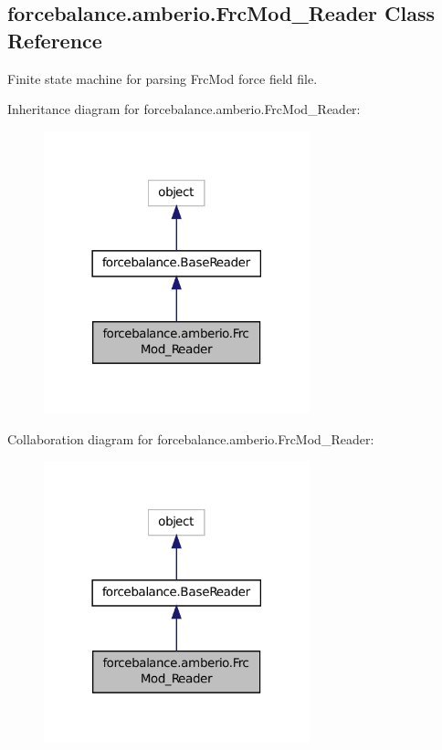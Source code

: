 \hypertarget{classforcebalance_1_1amberio_1_1FrcMod__Reader}{\subsection{forcebalance.\-amberio.\-Frc\-Mod\-\_\-\-Reader Class Reference}
\label{classforcebalance_1_1amberio_1_1FrcMod__Reader}
}


Finite state machine for parsing Frc\-Mod force field file.  




Inheritance diagram for forcebalance.\-amberio.\-Frc\-Mod\-\_\-\-Reader\-:\nopagebreak
\begin{figure}[H]
\begin{center}
\leavevmode
\includegraphics[width=218pt]{classforcebalance_1_1amberio_1_1FrcMod__Reader__inherit__graph}
\end{center}
\end{figure}


Collaboration diagram for forcebalance.\-amberio.\-Frc\-Mod\-\_\-\-Reader\-:\nopagebreak
\begin{figure}[H]
\begin{center}
\leavevmode
\includegraphics[width=218pt]{classforcebalance_1_1amberio_1_1FrcMod__Reader__coll__graph}
\end{center}
\end{figure}

